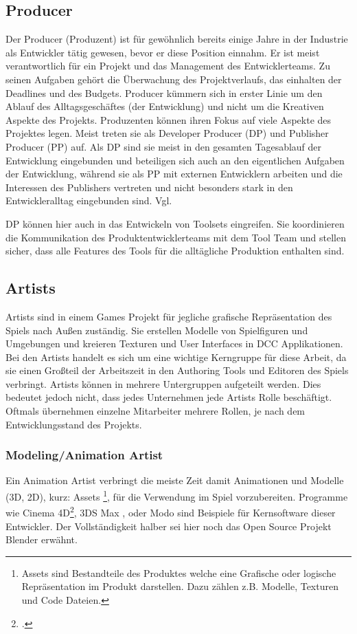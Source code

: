 \documentclass[pagesize, paper=a4, fontsize=12pt, titlepage=true, headings=small, headnosepline, abstractoff, liststotoc, nochapterprefix, plainheadsepline, twoside]{scrreprt}
\begin{document}
\subsection{Producer}
Der Producer (Produzent) ist für gewöhnlich bereits einige Jahre in der Industrie als Entwickler tätig gewesen, bevor er diese Position einnahm. Er ist meist verantwortlich für ein Projekt und das Management des Entwicklerteams. Zu seinen Aufgaben gehört die Überwachung des Projektverlaufs, das einhalten der Deadlines und des Budgets. Producer kümmern sich in erster Linie um den Ablauf des Alltagsgeschäftes (der Entwicklung) und nicht um die Kreativen Aspekte des Projekts. Produzenten können ihren Fokus auf viele Aspekte des Projektes legen. Meist treten sie als Developer Producer (DP) und Publisher Producer (PP) auf. Als DP sind sie meist in den gesamten Tagesablauf der Entwicklung eingebunden und beteiligen sich auch an den eigentlichen Aufgaben der Entwicklung, während sie als PP mit externen Entwicklern arbeiten und die Interessen des Publishers vertreten und nicht besonders stark in den Entwickleralltag eingebunden sind. Vgl. 

DP können hier auch in das Entwickeln von Toolsets eingreifen. Sie koordinieren die Kommunikation des Produktentwicklerteams mit dem Tool Team und stellen sicher, dass alle Features des Tools für die alltägliche Produktion enthalten sind.

\subsection{Artists}
Artists sind in einem Games Projekt für jegliche grafische Repräsentation des Spiels nach Außen zuständig. Sie erstellen Modelle von Spielfiguren und Umgebungen und kreieren Texturen und User Interfaces in DCC Applikationen. Bei den Artists handelt es sich um eine wichtige Kerngruppe für diese Arbeit, da sie einen Großteil der Arbeitszeit in den Authoring Tools und Editoren des Spiels verbringt. Artists können in mehrere Untergruppen aufgeteilt werden. Dies bedeutet jedoch nicht, dass jedes Unternehmen jede Artists Rolle beschäftigt. Oftmals übernehmen einzelne Mitarbeiter mehrere Rollen, je nach dem Entwicklungsstand des Projekts.

\subsubsection{Modeling/Animation Artist}
Ein Animation Artist verbringt die meiste Zeit damit Animationen und Modelle (3D, 2D), kurz: Assets \footnote{Assets sind Bestandteile des Produktes welche eine Grafische oder logische Repräsentation im Produkt darstellen. Dazu zählen z.B. Modelle, Texturen und Code Dateien.}, für die Verwendung im Spiel vorzubereiten. Programme wie Cinema 4D\footcite{MaxonC4d2014}, 3DS Max \parencite{AutodeskMax2014}, oder Modo\parencite{FoundryModo2014} sind Beispiele für Kernsoftware dieser Entwickler. Der Vollständigkeit halber sei hier noch das Open Source Projekt Blender \parencite{Blender2015} erwähnt.
\end{document}
